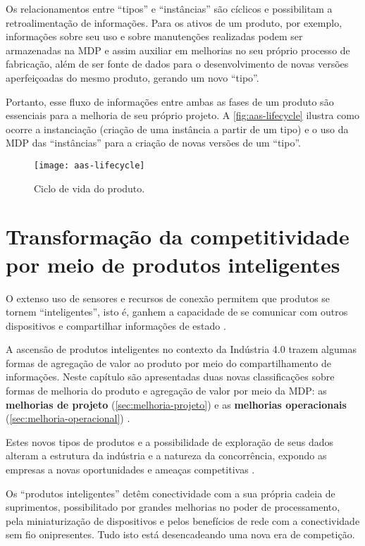 Os relacionamentos entre ``tipos'' e ``instâncias'' são cíclicos e possibilitam a retroalimentação de informações. Para os ativos de um produto, por exemplo, informações sobre seu uso e sobre manutenções realizadas podem ser armazenadas na MDP e assim auxiliar em melhorias no seu próprio processo de fabricação, além de ser fonte de dados para o desenvolvimento de novas versões aperfeiçoadas do mesmo produto, gerando um novo ``tipo''.

Portanto, esse fluxo de informações entre ambas as fases de um produto são essenciais para a melhoria de seu próprio projeto. A \autoref{fig:aas-lifecycle} ilustra como ocorre a instanciação (criação de uma instância a partir de um tipo) e o uso da MDP das ``instâncias'' para a criação de novas versões de um ``tipo''.

\begin{figure}[htb!]
	\centering
	\texttt{[image: aas-lifecycle]}
	\caption{Ciclo de vida do produto.}
	\label{fig:aas-lifecycle}
\end{figure}

\section{Transformação da competitividade por meio de produtos inteligentes}

O extenso uso de sensores e recursos de conexão permitem que produtos se tornem ``inteligentes'', isto é, ganhem a capacidade de se comunicar com outros dispositivos e compartilhar informações de estado \cite{framling2013plm}.

A ascensão de produtos inteligentes no contexto da Indústria 4.0 trazem algumas formas de agregação de valor ao produto por meio do compartilhamento de informações. Neste capítulo são apresentadas duas novas classificações sobre formas de melhoria do produto e agregação de valor por meio da MDP: as \textbf{melhorias de projeto} (\autoref{sec:melhoria-projeto}) e as \textbf{melhorias operacionais} (\autoref{sec:melhoria-operacional}) .

Estes novos tipos de produtos e a possibilidade de exploração de seus dados alteram a estrutura da indústria e a natureza da concorrência, expondo as empresas a novas oportunidades e ameaças competitivas \cite{porter2014smartproducts}.

Os ``produtos inteligentes'' detêm conectividade com a sua própria cadeia de suprimentos, possibilitado por grandes melhorias no poder de processamento, pela miniaturização de dispositivos e pelos benefícios de rede com a conectividade sem fio onipresentes. Tudo isto está desencadeando uma nova era de competição.


